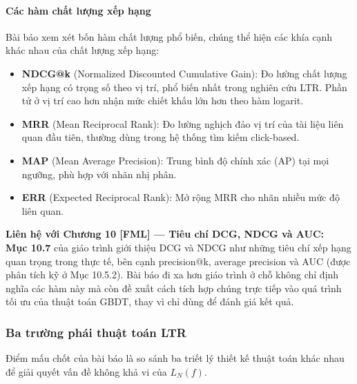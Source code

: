 \paragraph{Các hàm chất lượng xếp hạng}
Bài báo xem xét bốn hàm chất lượng phổ biến, chúng thể hiện các khía cạnh khác nhau của chất lượng xếp hạng:

\begin{itemize}
  \item \textbf{NDCG@k} (Normalized Discounted Cumulative Gain): Đo lường chất lượng xếp hạng có trọng số theo vị trí, phổ biến nhất trong nghiên cứu LTR. Phần tử ở vị trí cao hơn nhận mức chiết khấu lớn hơn theo hàm logarit.
  \item \textbf{MRR} (Mean Reciprocal Rank): Đo lường nghịch đảo vị trí của tài liệu liên quan đầu tiên, thường dùng trong hệ thống tìm kiếm click-based.
  \item \textbf{MAP} (Mean Average Precision): Trung bình độ chính xác (AP) tại mọi ngưỡng, phù hợp với nhãn nhị phân.
  \item \textbf{ERR} (Expected Reciprocal Rank): Mở rộng MRR cho nhãn nhiều mức độ liên quan.
\end{itemize}

\begin{lienhe_ly_thuyet}
  \textbf{Liên hệ với Chương 10 [FML] --- Tiêu chí DCG, NDCG và AUC:} \\
  \textbf{Mục 10.7} của giáo trình giới thiệu DCG và NDCG như những tiêu chí xếp hạng quan trọng trong thực tế, bên cạnh precision@k, average precision và AUC (được phân tích kỹ ở Mục 10.5.2). Bài báo đi xa hơn giáo trình ở chỗ không chỉ định nghĩa các hàm này mà còn đề xuất cách tích hợp chúng trực tiếp vào quá trình tối ưu của thuật toán GBDT, thay vì chỉ dùng để đánh giá kết quả.
\end{lienhe_ly_thuyet}

\subsubsection{Ba trường phái thuật toán LTR}
Điểm mấu chốt của bài báo là so sánh ba triết lý thiết kế thuật toán khác nhau để giải quyết vấn đề không khả vi của $L_N(f)$.

